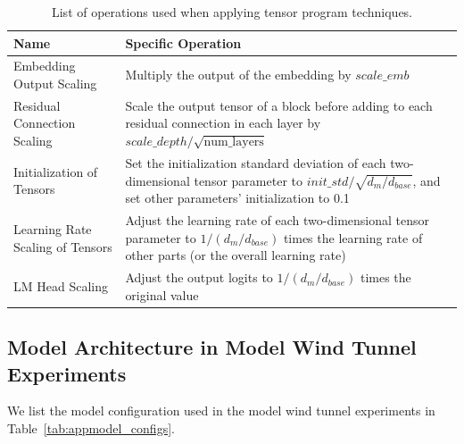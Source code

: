 \begin{table}[h]
\centering
\begin{tabular}{l|p{8cm}}
\toprule
\textbf{Name}                       & \textbf{Specific Operation}                                                                                                                 \\ \midrule
Embedding Output Scaling            & Multiply the output of the embedding by $scale\_{emb}$                                                                                                                                                     \\ \hline
Residual Connection Scaling         & Scale the output tensor of a block before adding to each residual connection in each layer by $scale\_{depth}/\sqrt{\text{num\_layers}}$ 
\\ \hline
Initialization of Tensors           & Set the initialization standard deviation of each two-dimensional tensor parameter to $init\_std/\sqrt{d_m/d_{base}}$, and set other parameters' initialization to 0.1                  \\ \hline
Learning Rate Scaling of Tensors    & Adjust the learning rate of each two-dimensional tensor parameter to $1/({d_m/d_{base}}) $ times the learning rate of other parts (or the overall learning rate)                    \\ \hline
LM Head Scaling                    & Adjust the output logits to $1/(d_m/d_{base})$ times the original value                                                                                                           \\ \bottomrule
\end{tabular}
\caption{List of operations used when applying tensor program techniques.}
\label{tab:mup}
\end{table}

\subsection{Model Architecture in Model Wind Tunnel Experiments}
We list the model configuration used in the model wind tunnel experiments in Table~\ref{tab:appmodel_configs}.

